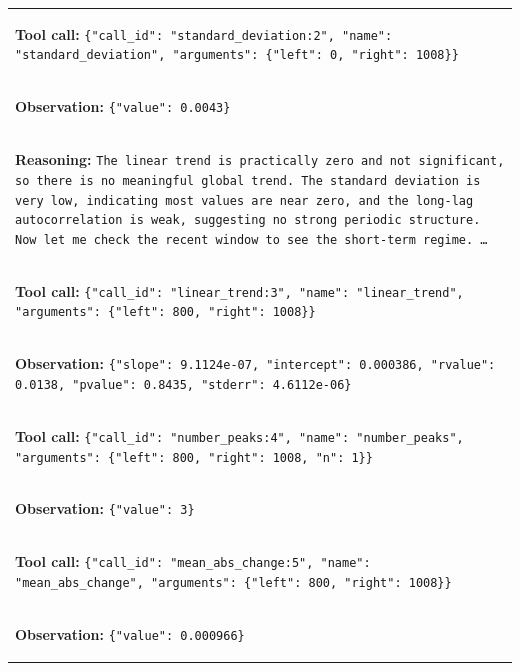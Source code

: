 \documentclass[11pt]{article}
\begin{document}
\begin{table}[t]
\begin{tabular}{p{}}
\hdashline

\colorbox{red!10}{\parbox{0.95\textwidth}{%
\textbf{Tool call:}
\texttt{\{"call\_id": "standard\_deviation:2", "name":
"standard\_deviation", "arguments": \{"left": 0, "right": 1008\}\}}
}} \\

\colorbox{blue!10}{\parbox{0.95\textwidth}{%
\textbf{Observation:}
\texttt{\{"value": 0.0043\}}
}} \\

\hdashline

\colorbox{green!10}{\parbox{0.95\textwidth}{%
\textbf{Reasoning:}
\texttt{The linear trend is practically zero and not significant, so there is
no meaningful global trend. The standard deviation is very low, indicating most
values are near zero, and the long-lag autocorrelation is weak, suggesting no
strong periodic structure. Now let me check the recent window to see the
short-term regime. \ldots}
}} \\

\hdashline

\colorbox{red!10}{\parbox{0.95\textwidth}{%
\textbf{Tool call:}
\texttt{\{"call\_id": "linear\_trend:3", "name": "linear\_trend",
"arguments": \{"left": 800, "right": 1008\}\}}
}} \\

\colorbox{blue!10}{\parbox{0.95\textwidth}{%
\textbf{Observation:}
\texttt{\{"slope": 9.1124e-07, "intercept": 0.000386, "rvalue": 0.0138,
"pvalue": 0.8435, "stderr": 4.6112e-06\}}
}} \\

\hdashline

\colorbox{red!10}{\parbox{0.95\textwidth}{%
\textbf{Tool call:}
\texttt{\{"call\_id": "number\_peaks:4", "name": "number\_peaks",
"arguments": \{"left": 800, "right": 1008, "n": 1\}\}}
}} \\

\colorbox{blue!10}{\parbox{0.95\textwidth}{%
\textbf{Observation:}
\texttt{\{"value": 3\}}
}} \\

\hdashline

\colorbox{red!10}{\parbox{0.95\textwidth}{%
\textbf{Tool call:}
\texttt{\{"call\_id": "mean\_abs\_change:5", "name": "mean\_abs\_change",
"arguments": \{"left": 800, "right": 1008\}\}}
}} \\

\colorbox{blue!10}{\parbox{0.95\textwidth}{%
\textbf{Observation:}
\texttt{\{"value": 0.000966\}}
}} \\


\end{tabular}
\end{table}
\end{document}
